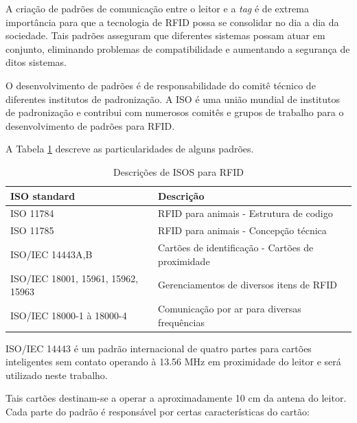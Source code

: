 A criação de padrões de comunicação entre o leitor e a \textit{tag} é de extrema importância para que a tecnologia de RFID possa se consolidar no dia a dia da sociedade. Tais padrões asseguram que diferentes sistemas possam atuar em conjunto, eliminando problemas de compatibilidade e aumentando a segurança de ditos sistemas.

O desenvolvimento de padrões é de responsabilidade do comitê técnico de diferentes institutos de padronização. A ISO é uma união mundial de institutos de padronização e contribui com numerosos comitês e grupos de trabalho para o desenvolvimento de padrões para RFID\cite{Fink}.

 A Tabela \ref{tab1} descreve as particularidades de alguns padrões.

\begin{table}[h!]

\begin{tabular}{|l|l|}

\hline
\textbf{ISO standard} & \textbf{ Descrição}\\
\hline
ISO 11784 & RFID para animais - Estrutura de codigo\\
\hline
ISO 11785 & RFID para animais - Concepção técnica\\
\hline
ISO/IEC 14443A,B & Cartões de identificação - Cartões de proximidade\\
\hline
ISO/IEC 18001, 15961, 15962, 15963 & Gerenciamentos de diversos itens de RFID\\
\hline
ISO/IEC 18000-1 à 18000-4 & Comunicação por ar para diversas frequências\\
\hline

\end{tabular}
\caption{Descrições de ISOS para RFID \cite{markham}}\label{tab1}
\end{table}


ISO/IEC 14443 é um padrão internacional de quatro partes para cartões inteligentes sem contato operando à 13.56 MHz em proximidade do leitor e será utilizado neste trabalho.

Tais cartões destinam-se a operar a aproximadamente 10 cm da antena do leitor. Cada parte do padrão é responsável por certas características do cartão:

